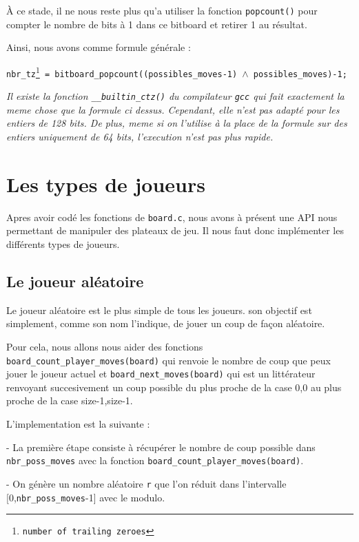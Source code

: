 \documentclass{report}
\begin{document}
À ce stade, il ne nous reste plus qu'a utiliser la fonction \texttt{popcount()} pour compter le nombre de bits à 1 dans ce bitboard et retirer 1 au résultat.

Ainsi, nous avons comme formule générale : \newline

\texttt{nbr\_tz\footnote{number of trailing zeroes} = bitboard\_popcount((possibles\_moves-1) $\wedge$ possibles\_moves)-1;}\newline

\textit{Il existe la fonction \texttt{\_\_builtin\_ctz()} du compilateur \texttt{gcc} qui fait exactement la meme chose que la formule ci dessus. Cependant, elle n'est pas adapté pour les entiers de 128 bits. De plus, meme si on l'utilise à la place de la formule sur des entiers uniquement de 64 bits, l'execution n'est pas plus rapide.}

\section{Les types de joueurs}
Apres avoir codé les fonctions de \texttt{board.c}, nous avons à présent une API nous permettant de manipuler des plateaux de jeu. Il nous faut donc implémenter les différents types de joueurs.

\subsection{Le joueur aléatoire}
Le joueur aléatoire est le plus simple de tous les joueurs. son objectif est simplement, comme son nom l'indique, de jouer un coup de façon aléatoire.\newline

Pour cela, nous allons nous aider des fonctions \texttt{board\_count\_player\_moves(board)} qui renvoie le nombre de coup que peux jouer le joueur actuel et \texttt{board\_next\_moves(board)} qui est un littérateur renvoyant succesivement un coup possible du plus proche de la case 0,0 au plus proche de la case size-1,size-1.\newline

L'implementation est la suivante :

- La première étape consiste à récupérer le nombre de coup possible dans \texttt{nbr\_poss\_moves} avec la fonction \texttt{board\_count\_player\_moves(board)}.

- On génère un nombre aléatoire \texttt{r} que l'on réduit dans l'intervalle [0,\texttt{nbr\_poss\_moves}-1] avec le modulo.
\end{document}
